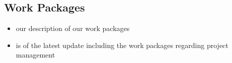 \subsection{Work Packages}


\begin{itemize}
    \item our description of our work packages
    \item is of the latest update including the work packages regarding project management
\end{itemize}

